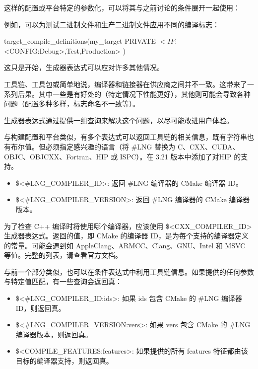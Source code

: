 这样的配置或平台特定的参数化，可以将其与之前讨论的条件展开一起使用：


例如，可以为测试二进制文件和生产二进制文件应用不同的编译标志：

\begin{cmake}
target_compile_definitions(my_target PRIVATE
    $<IF:$<CONFIG:Debug>,Test,Production>
)
\end{cmake}

这只是开始，生成器表达式可以应对许多其他情况。


工具链、工具包或简单地说，编译器和链接器在供应商之间并不一致。这带来了一系列后果。其中一些是有好处的（特定情况下性能更好），其他则可能会导致各种问题（配置多种多样，标志命名不一致等）。

生成器表达式通过提供一组查询来解决这个问题，以尽可能改进用户体验。

与构建配置和平台类似，有多个表达式可以返回工具链的相关信息，既有字符串也有布尔值。但必须指定感兴趣的语言（将 \#LNG 替换为 C、CXX、CUDA、OBJC、OBJCXX、Fortran、HIP 或 ISPC）。在 3.21 版本中添加了对HIP 的支持。

\begin{itemize}
\item
\$<\#LNG\_COMPILER\_ID>: 返回 \#LNG 编译器的 CMake 编译器 ID。

\item
\$<\#LNG\_COMPILER\_VERSION>: 返回 \#LNG 编译器的 CMake 编译器版本。
\end{itemize}

为了检查 C++ 编译时将使用哪个编译器，应该使用 \$<CXX\_COMPILER\_ID> 生成器表达式。返回的值，即 CMake 的编译器 ID，是为每个支持的编译器定义的常量。可能会遇到如 AppleClang、ARMCC、Clang、GNU、Intel 和 MSVC 等值。完整的列表，请查看官方文档。

与前一个部分类似，也可以在条件表达式中利用工具链信息。如果提供的任何参数与特定值匹配，有一些查询会返回真：

\begin{itemize}
\item
\$<\#LNG\_COMPILER\_ID:ids>: 如果 ids 包含 CMake 的 \#LNG 编译器 ID，则返回真。

\item
\$<\#LNG\_COMPILER\_VERSION:vers>: 如果 vers 包含 CMake 的 \#LNG 编译器版本，则返回真。

\item
\$<COMPILE\_FEATURES:features>: 如果提供的所有 features 特征都由该目标的编译器支持，则返回真。
\end{itemize}

